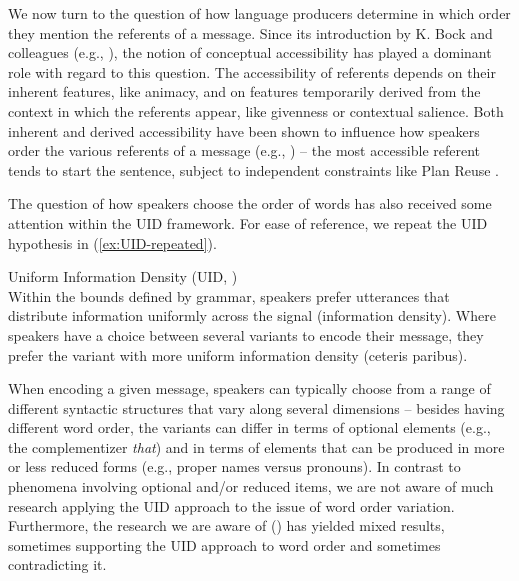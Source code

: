 \documentclass[output=paper,colorlinks,citecolor=brown]{langscibook}
\begin{document}
We now turn to the question of how language producers determine in which order they mention the referents of a message. Since its introduction by K. Bock and colleagues (e.g., \citealt{Bock::Warren-85}), the notion of conceptual accessibility has played a dominant role with regard to this question. The accessibility of referents depends on their inherent features, like animacy, and on features temporarily derived from the context in which the referents appear, like givenness or contextual salience. Both inherent and derived accessibility have been shown to influence how speakers order the various referents of a message (e.g., \citealt{McDonald::al-93, Ferreira-94, Prat-Sala::Branigan-00}) -- the most accessible referent tends to start the sentence, subject to independent constraints like Plan Reuse \citep{MacDonald-13-How-language-production}.

The question of how speakers choose the order of words has also received some attention within the UID framework. For ease of reference, we repeat the UID hypothesis in (\ref{ex:UID-repeated}). 

\ea Uniform Information Density (UID, \citealt[25]{Jaeger-10})\label{ex:UID-repeated}\\
Within the bounds defined by grammar, speakers prefer utterances that distribute information uniformly across the signal (information density). Where speakers have a choice between several variants to encode their message, they prefer the variant with more uniform information density (ceteris paribus).
\z

When encoding a given message, speakers can typically choose from a range of different syntactic structures that vary along several dimensions -- besides having different word order, the variants can differ in terms of optional elements (e.g., the complementizer \textit{that}) and in terms of elements that can be produced in more or less reduced forms (e.g., proper names versus pronouns). In contrast to phenomena involving optional and/or reduced items, we are not aware of much research applying the UID approach to the issue of word order variation. Furthermore, the research we are aware of (\citealt{Maurits::al-10, Collins-14, Jain::al-18, Rubio-Fernandez::al-21}) has yielded mixed results, sometimes supporting the UID approach to word order and sometimes contradicting it.
\end{document}
